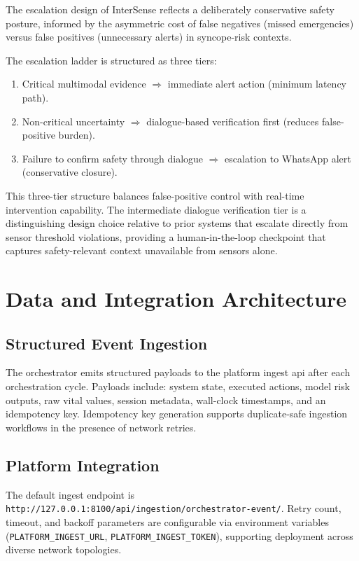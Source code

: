 \documentclass[10pt,twocolumn,a4paper]{article}
\begin{document}
The escalation design of InterSense reflects a deliberately
conservative safety posture, informed by the asymmetric cost of false
negatives (missed emergencies) versus false positives (unnecessary
alerts) in \gls{syncope}-risk contexts.

The escalation ladder is structured as three tiers:
\begin{enumerate}
  \item Critical multimodal evidence $\Rightarrow$ immediate alert
        action (minimum latency path).
  \item Non-critical uncertainty $\Rightarrow$ dialogue-based
        verification first (reduces false-positive burden).
  \item Failure to confirm safety through dialogue $\Rightarrow$
        escalation to WhatsApp alert (conservative closure).
\end{enumerate}
This three-tier structure balances false-positive control with
real-time intervention capability.  The intermediate dialogue
verification tier is a distinguishing design choice relative to prior
systems that escalate directly from sensor threshold violations,
providing a human-in-the-loop checkpoint that captures safety-relevant
context unavailable from sensors alone.

\section{Data and Integration Architecture}

\subsection{Structured Event Ingestion}

The orchestrator emits structured payloads to the platform ingest
\gls{api} after each orchestration cycle.  Payloads include: system
state, executed actions, model risk outputs, raw vital values, session
metadata, wall-clock timestamps, and an idempotency key.  Idempotency
key generation supports duplicate-safe ingestion workflows in the
presence of network retries.

\subsection{Platform Integration}

The default ingest endpoint is
\texttt{http://127.0.0.1:8100/api/ingestion/orchestrator-event/}.
Retry count, timeout, and backoff parameters are configurable via
environment variables (\texttt{PLATFORM\_INGEST\_URL},
\texttt{PLATFORM\_INGEST\_TOKEN}), supporting deployment across diverse
network topologies.
\end{document}
